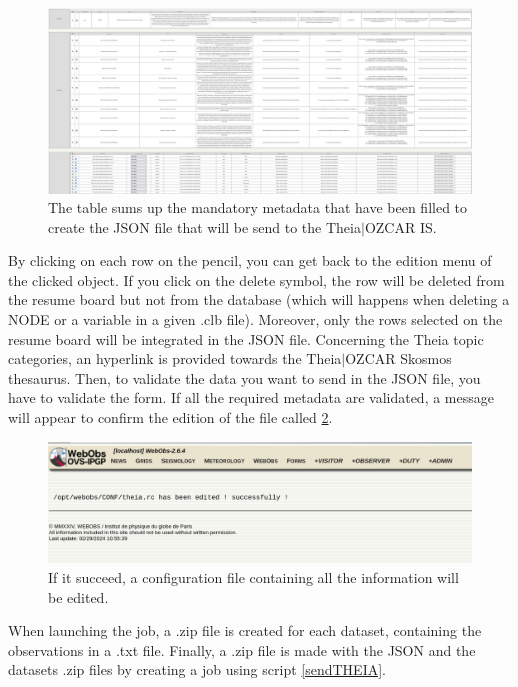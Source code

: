 \begin{figure}[!h]
	\centering
	\includegraphics[width=\textwidth]{figures/theia/recap_table.png}
	\caption{The table sums up the mandatory metadata that have been filled to create the JSON file that will be send to the Theia$\vert$OZCAR IS.}
	\label{recap_table}
\end{figure}

By clicking on each row on the pencil, you can get back to the edition menu of the clicked object. If you click on the delete symbol, the row will be deleted from the resume board but not from the database (which will happens when deleting a NODE or a variable in a given .clb file). Moreover, only the rows selected on the resume board will be integrated in the JSON file. Concerning the Theia topic categories, an hyperlink is provided towards the Theia$\vert$OZCAR Skosmos thesaurus. Then, to validate the data you want to send in the JSON file, you have to validate the form. If all the required metadata are validated, a message will appear to confirm the edition of the file called  \ref{theia.rc}.

\begin{figure}[!h]
	\centering
	\includegraphics[scale=0.25]{figures/theia/theia_rc.png}
	\caption{If it succeed, a configuration file containing all the information will be edited.}
	\label{theia.rc}
\end{figure}

When launching the job, a .zip file is created for each dataset, containing the observations in a .txt file. Finally, a .zip file is made with the JSON and the datasets .zip files by creating a job using  script \ref{sendTHEIA}.

